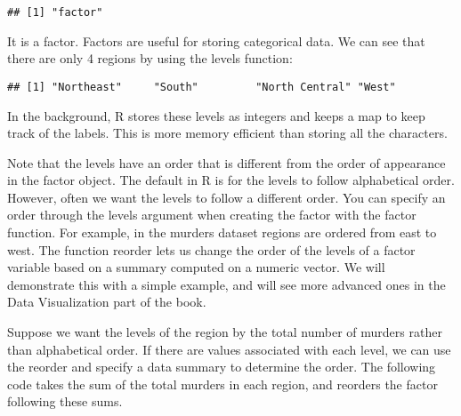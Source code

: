 \documentclass[
]{article}
\newenvironment{Shaded}{\begin{snugshade}}{\end{snugshade}}
\newcommand{\AttributeTok}[1]{\textcolor[rgb]{0.77,0.63,0.00}{#1}}
\newcommand{\FunctionTok}[1]{\textcolor[rgb]{0.00,0.00,0.00}{#1}}
\newcommand{\NormalTok}[1]{#1}
\newcommand{\OtherTok}[1]{\textcolor[rgb]{0.56,0.35,0.01}{#1}}
\newcommand{\SpecialCharTok}[1]{\textcolor[rgb]{0.00,0.00,0.00}{#1}}
\begin{document}
\begin{Shaded}
\end{Shaded}

\begin{verbatim}
## [1] "factor"
\end{verbatim}

It is a factor. Factors are useful for storing categorical data. We can
see that there are only 4 regions by using the levels function:

\begin{Shaded}
\end{Shaded}

\begin{verbatim}
## [1] "Northeast"     "South"         "North Central" "West"
\end{verbatim}

In the background, R stores these levels as integers and keeps a map to
keep track of the labels. This is more memory efficient than storing all
the characters.

Note that the levels have an order that is different from the order of
appearance in the factor object. The default in R is for the levels to
follow alphabetical order. However, often we want the levels to follow a
different order. You can specify an order through the levels argument
when creating the factor with the factor function. For example, in the
murders dataset regions are ordered from east to west. The function
reorder lets us change the order of the levels of a factor variable
based on a summary computed on a numeric vector. We will demonstrate
this with a simple example, and will see more advanced ones in the Data
Visualization part of the book.

Suppose we want the levels of the region by the total number of murders
rather than alphabetical order. If there are values associated with each
level, we can use the reorder and specify a data summary to determine
the order. The following code takes the sum of the total murders in each
region, and reorders the factor following these sums.

\begin{Shaded}
\end{Shaded}
\end{document}
